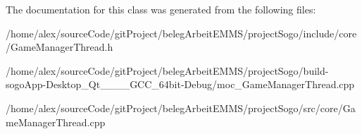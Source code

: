The documentation for this class was generated from the following files\-:\begin{DoxyCompactItemize}
\item 
/home/alex/source\-Code/git\-Project/beleg\-Arbeit\-E\-M\-M\-S/project\-Sogo/include/core/Game\-Manager\-Thread.\-h\item 
/home/alex/source\-Code/git\-Project/beleg\-Arbeit\-E\-M\-M\-S/project\-Sogo/build-\/sogo\-App-\/\-Desktop\-\_\-\-Qt\-\_\-\_\-\_\-\_\-\-G\-C\-C\-\_\-64bit-\/\-Debug/moc\-\_\-\-Game\-Manager\-Thread.\-cpp\item 
/home/alex/source\-Code/git\-Project/beleg\-Arbeit\-E\-M\-M\-S/project\-Sogo/src/core/Game\-Manager\-Thread.\-cpp\end{DoxyCompactItemize}
